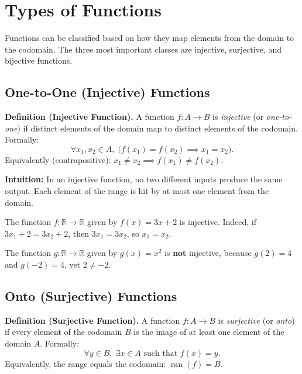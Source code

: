 \documentclass[11pt,a4paper]{article}
\begin{document}
\section{Types of Functions}

Functions can be classified based on how they map elements from the domain to the codomain. The three most important classes are injective, surjective, and bijective functions.

\subsection{One-to-One (Injective) Functions}

\textbf{Definition (Injective Function).} A function $f: A \to B$ is \textit{injective} (or \textit{one-to-one}) if distinct elements of the domain map to distinct elements of the codomain. Formally:
\begin{equation*}
    \forall x_1, x_2 \in A,\; \bigl(f(x_1) = f(x_2) \implies x_1 = x_2\bigr).
\end{equation*}
Equivalently (contrapositive): $x_1 \neq x_2 \implies f(x_1) \neq f(x_2)$.

\textbf{Intuition:} In an injective function, no two different inputs produce the same output. Each element of the range is hit by at most one element from the domain.

\begin{example}[Injective]
The function $f: \mathbb{R} \to \mathbb{R}$ given by $f(x) = 3x + 2$ is injective. Indeed, if $3x_1 + 2 = 3x_2 + 2$, then $3x_1 = 3x_2$, so $x_1 = x_2$.
\end{example}

\begin{example}
The function $g: \mathbb{R} \to \mathbb{R}$ given by $g(x) = x^2$ is \textbf{not} injective, because $g(2) = 4$ and $g(-2) = 4$, yet $2 \neq -2$.
\end{example}

\subsection{Onto (Surjective) Functions}

\textbf{Definition (Surjective Function).} A function $f: A \to B$ is \textit{surjective} (or \textit{onto}) if every element of the codomain $B$ is the image of at least one element of the domain $A$. Formally:
\begin{equation*}
    \forall y \in B,\; \exists x \in A \text{ such that } f(x) = y.
\end{equation*}
Equivalently, the range equals the codomain: $\operatorname{ran}(f) = B$.
\end{document}
